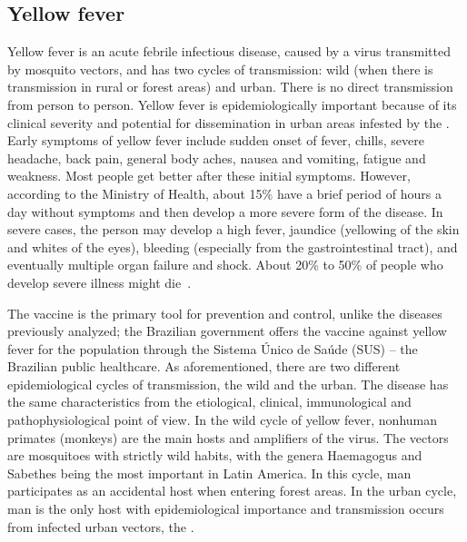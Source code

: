 \subsection{Yellow fever}
%
Yellow fever is an acute febrile infectious disease, caused by a virus transmitted by mosquito vectors, and has two cycles of transmission: wild (when there is transmission in rural or forest areas) and urban.
There is no direct transmission from person to person.
Yellow fever is epidemiologically important because of its clinical severity and potential for dissemination in urban areas infested by the \Aedes.
Early symptoms of yellow fever include sudden onset of fever, chills, severe headache, back pain, general body aches, nausea and vomiting, fatigue and weakness. Most people get better after these initial symptoms. However, according to the Ministry of Health, about 15\% have a brief period of hours a day without symptoms and then develop a more severe form of the disease. In severe cases, the person may develop a high fever, jaundice (yellowing of the skin and whites of the eyes), bleeding (especially from the gastrointestinal tract), and eventually multiple organ failure and shock. About 20\% to 50\% of people who develop severe illness might die~\cite{web:MSyellowfever}.

The vaccine is the primary tool for prevention and control, unlike the diseases previously analyzed; the Brazilian government offers the vaccine against yellow fever for the population through the Sistema Único de Saúde (SUS) -- the Brazilian public healthcare.
As aforementioned, there are two different epidemiological cycles of transmission, the wild and the urban.
The disease has the same characteristics from the etiological, clinical, immunological and pathophysiological point of view. In the wild cycle of yellow fever, nonhuman primates (monkeys) are the main hosts and amplifiers of the virus. The vectors are mosquitoes with strictly wild habits, with the genera Haemagogus and Sabethes being the most important in Latin America. In this cycle, man participates as an accidental host when entering forest areas. In the urban cycle, man is the only host with epidemiological importance and transmission occurs from infected urban vectors, the \Aedes\cite{camara2011dynamic}.

